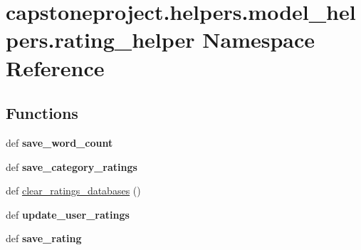 \hypertarget{namespacecapstoneproject_1_1helpers_1_1model__helpers_1_1rating__helper}{}\section{capstoneproject.\+helpers.\+model\+\_\+helpers.\+rating\+\_\+helper Namespace Reference}
\label{namespacecapstoneproject_1_1helpers_1_1model__helpers_1_1rating__helper}
\subsection*{Functions}
\begin{DoxyCompactItemize}
\item 
\mbox{\label{namespacecapstoneproject_1_1helpers_1_1model__helpers_1_1rating__helper_a90e5bee8ff5ac22c111a499f57a80267}} 
def {\bfseries save\+\_\+word\+\_\+count}
\item 
\mbox{\label{namespacecapstoneproject_1_1helpers_1_1model__helpers_1_1rating__helper_ab13b4fe5b57d154ee54970a2bc1794ff}} 
def {\bfseries save\+\_\+category\+\_\+ratings}
\item 
def \mbox{\hyperlink{namespacecapstoneproject_1_1helpers_1_1model__helpers_1_1rating__helper_a9c0e180a3be0ce11bd0ace717766f1ea}{clear\+\_\+ratings\+\_\+databases}} ()
\item 
\mbox{\label{namespacecapstoneproject_1_1helpers_1_1model__helpers_1_1rating__helper_a293b9d8592ef45d637ad3b264a909514}} 
def {\bfseries update\+\_\+user\+\_\+ratings}
\item 
\mbox{\label{namespacecapstoneproject_1_1helpers_1_1model__helpers_1_1rating__helper_aec607b5a25871f8a317fc99639c5f20f}} 
def {\bfseries save\+\_\+rating}
\item 
\mbox{\label{namespacecapstoneproject_1_1helpers_1_1model__helpers_1_1rating__helper_af3b67d8b337173d3072c4e017434ab59}} 

\end{DoxyCompactItemize}
